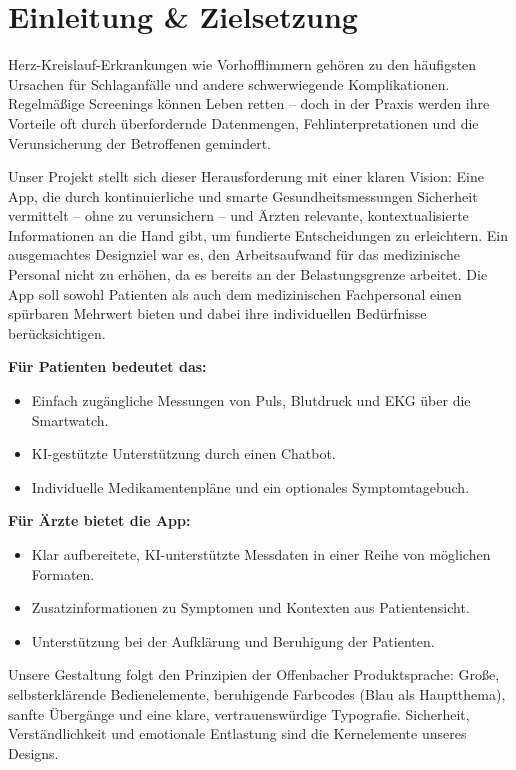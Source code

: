 \section{Einleitung \& Zielsetzung}
Herz-Kreislauf-Erkrankungen wie Vorhofflimmern gehören zu den häufigsten Ursachen für Schlaganfälle und andere schwerwiegende Komplikationen. Regelmäßige Screenings können Leben retten – doch in der Praxis werden ihre Vorteile oft durch überfordernde Datenmengen, Fehlinterpretationen und die Verunsicherung der Betroffenen gemindert.

Unser Projekt stellt sich dieser Herausforderung mit einer klaren Vision: Eine App, die durch kontinuierliche und smarte Gesundheitsmessungen Sicherheit vermittelt – ohne zu verunsichern – und Ärzten relevante, kontextualisierte Informationen an die Hand gibt, um fundierte Entscheidungen zu erleichtern. Ein ausgemachtes Designziel war es, den Arbeitsaufwand für das medizinische Personal nicht zu erhöhen, da es bereits an der Belastungsgrenze arbeitet. Die App soll sowohl Patienten als auch dem medizinischen Fachpersonal einen spürbaren Mehrwert bieten und dabei ihre individuellen Bedürfnisse berücksichtigen.

\textbf{Für Patienten bedeutet das:}
\begin{itemize}
	\item Einfach zugängliche Messungen von Puls, Blutdruck und EKG über die Smartwatch.
	\item KI-gestützte Unterstützung durch einen Chatbot.
	\item Individuelle Medikamentenpläne und ein optionales Symptomtagebuch.
\end{itemize}

\textbf{Für Ärzte bietet die App:}
\begin{itemize}
	\item Klar aufbereitete, KI-unterstützte Messdaten in einer Reihe von möglichen Formaten.
	\item Zusatzinformationen zu Symptomen und Kontexten aus Patientensicht.
	\item Unterstützung bei der Aufklärung und Beruhigung der Patienten.
\end{itemize}

Unsere Gestaltung folgt den Prinzipien der Offenbacher Produktsprache: Große, selbsterklärende Bedienelemente, beruhigende Farbcodes (Blau als Hauptthema), sanfte Übergänge und eine klare, vertrauenswürdige Typografie. Sicherheit, Verständlichkeit und emotionale Entlastung sind die Kernelemente unseres Designs.
